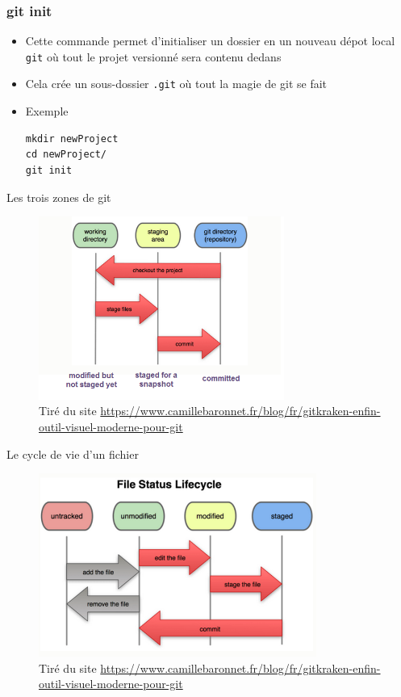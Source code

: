 \documentclass{beamer}
\begin{document}
\begin{frame}[fragile]
\frametitle{git init}

\begin{itemize}
\item Cette commande permet d'initialiser un dossier en un nouveau dépot local \texttt{git} où tout le projet versionné sera contenu dedans

\item Cela crée un sous-dossier \texttt{.git} où tout la magie de git se fait
\item Exemple
\begin{lstlisting}
mkdir newProject
cd newProject/
git init
\end{lstlisting}
\end{itemize}
\end{frame}

\begin{frame}{Les trois zones de git}
\begin{figure}
    \centering
    \includegraphics[height=6cm]{img/git-local-operations.png}
    \caption{Tiré du site \url{https://www.camillebaronnet.fr/blog/fr/gitkraken-enfin-outil-visuel-moderne-pour-git}}
\end{figure}
\end{frame}

\begin{frame}{Le cycle de vie d'un fichier}
\begin{figure}
    \centering
    \includegraphics[height=6cm]{img/git-filestatuslifecycle.png}
    \caption{Tiré du site \url{https://www.camillebaronnet.fr/blog/fr/gitkraken-enfin-outil-visuel-moderne-pour-git}}
\end{figure}
\end{frame}
\end{document}

